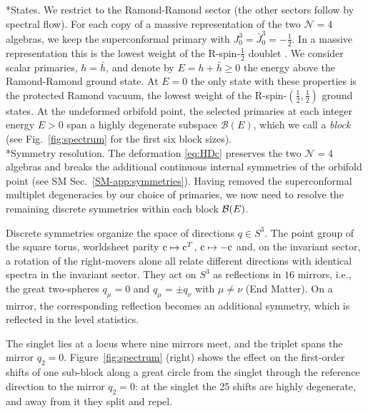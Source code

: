 \documentclass[aps,twocolumn,preprintnumbers,groupedaddress,nofootinbib,prl]{revtex4-2}
\makeatletter
\renewcommand\paragraph{\@startsection{paragraph}{4}{\parindent}{\z@}{-1em}{\normalfont\normalsize\bfseries}}
\newcommand{\B}{\mathcal B}
\newcommand{\cMat}{{\rm c}}
\makeatother
\begin{document}
\paragraph*{States.}
We restrict to the Ramond-Ramond sector (the other sectors follow by spectral flow). For each copy of a massive representation of the two $\mathcal N=4$ algebras, we keep the superconformal primary with $J^3_0=\bar J^3_0=-\frac12$. In a massive representation this is the lowest weight of the R-spin-$\frac12$ doublet \cite{Eguchi:1987wf}. We consider scalar primaries, $h=\bar h$, and denote by $E=h+\bar h\ge0$ the energy above the Ramond-Ramond ground state. At $E=0$ the only state with these properties is the protected Ramond vacuum, the lowest weight of the R-spin-$(\frac12,\frac12)$ ground states. At the undeformed orbifold point, the selected primaries at each integer energy $E>0$ span a highly degenerate subspace $\B(E)$, which we call a {\it block} (see Fig.~\ref{fig:spectrum} for the first six block sizes).\\

\paragraph*{Symmetry resolution.}
The deformation \eqref{eq:HDc} preserves the two $\mathcal N=4$ algebras and breaks the additional continuous internal symmetries of the orbifold point (see SM Sec.~\ref{SM-app:symmetries}). Having removed the superconformal multiplet degeneracies by our choice of primaries, we now need to resolve the remaining discrete symmetries within each block ${\cal B}(E)$.

Discrete symmetries organize the space of directions $q\in S^3$. The point group of the square torus, worldsheet parity $\cMat\mapsto \cMat^T$, $\cMat\mapsto-\cMat$ and, on the invariant sector, a rotation of the right-movers alone all relate different directions with identical spectra in the invariant sector. They act on $S^3$ as reflections in $16$ mirrors, i.e., the great two-spheres $q_\mu=0$ and $q_\mu=\pm q_\nu$ with $\mu\neq\nu$ (End Matter). On a mirror, the corresponding reflection becomes an additional symmetry, which is reflected in the level statistics.

The singlet lies at a locus where nine mirrors meet, and the triplet spans the mirror $q_2=0$. Figure~\ref{fig:spectrum} (right) shows the effect on the first-order shifts of one sub-block along a great circle from the singlet through the reference direction to the mirror $q_2=0$: at the singlet the 25 shifts are highly degenerate, and away from it they split and repel. 
\end{document}
